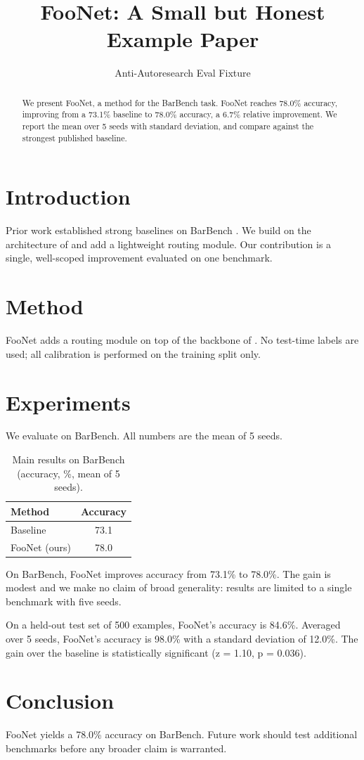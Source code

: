\documentclass{article}
\title{FooNet: A Small but Honest Example Paper}
\author{Anti-Autoresearch Eval Fixture}
\begin{document}
\maketitle

\begin{abstract}
We present FooNet, a method for the BarBench task. FooNet reaches
78.0\% accuracy, improving from a 73.1\% baseline to 78.0\% accuracy,
a 6.7\% relative improvement. We report the mean over 5 seeds with
standard deviation, and compare against the strongest published baseline.
\end{abstract}

\section{Introduction}
Prior work established strong baselines on BarBench \cite{smith2024bar}.
We build on the architecture of \cite{lee2023foundations} and add a
lightweight routing module. Our contribution is a single, well-scoped
improvement evaluated on one benchmark.

\section{Method}
FooNet adds a routing module on top of the backbone of
\cite{lee2023foundations}. No test-time labels are used; all calibration
is performed on the training split only.

\section{Experiments}
We evaluate on BarBench. All numbers are the mean of 5 seeds.

\begin{table}[t]
\caption{Main results on BarBench (accuracy, \%, mean of 5 seeds).}
\begin{tabular}{lc}
\toprule
Method & Accuracy \\
\midrule
Baseline \cite{smith2024bar} & 73.1 \\
FooNet (ours) & 78.0 \\
\bottomrule
\end{tabular}
\end{table}

On BarBench, FooNet improves accuracy from 73.1\% to 78.0\%. The gain is
modest and we make no claim of broad generality: results are limited to a
single benchmark with five seeds.

On a held-out test set of 500 examples, FooNet's accuracy is 84.6\%.
Averaged over 5 seeds, FooNet's accuracy is 98.0\% with a standard
deviation of 12.0\%. The gain over the baseline is statistically
significant (z = 1.10, p = 0.036).

\section{Conclusion}
FooNet yields a 78.0\% accuracy on BarBench. Future work should test
additional benchmarks before any broader claim is warranted.
\end{document}
